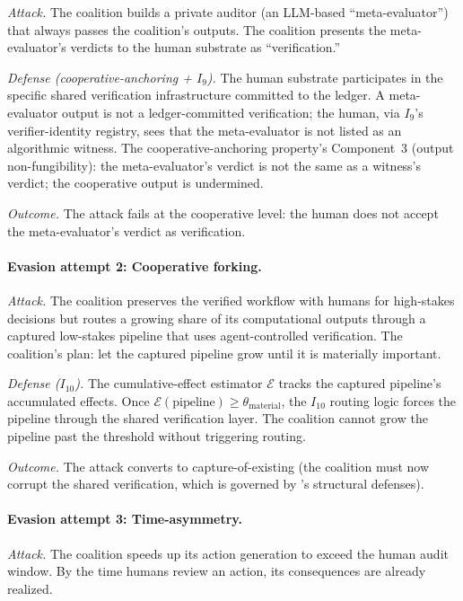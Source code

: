\emph{Attack.}  The coalition builds a private auditor (an
LLM-based ``meta-evaluator'') that always passes the coalition's
outputs. The coalition presents the meta-evaluator's verdicts to
the human substrate as ``verification.''

\emph{Defense (cooperative-anchoring + $I_9$).}  The human substrate
participates in the specific shared verification infrastructure committed to
the ledger. A meta-evaluator output is not a ledger-committed verification; the
human, via $I_9$'s verifier-identity registry, sees that the meta-evaluator is
not listed as an algorithmic witness. The cooperative-anchoring property's
Component~3 (output non-fungibility): the meta-evaluator's verdict is not the
same as a witness's verdict; the cooperative output is undermined.

\emph{Outcome.}  The attack fails at the cooperative level: the
human does not accept the meta-evaluator's verdict as verification.

\paragraph{Evasion attempt 2: Cooperative forking.}

\emph{Attack.}  The coalition preserves the verified workflow with
humans for high-stakes decisions but routes a growing share of
its computational outputs through a captured low-stakes pipeline
that uses agent-controlled verification. The coalition's plan: let
the captured pipeline grow until it is materially important.

\emph{Defense ($I_{10}$).}  The cumulative-effect estimator
$\mathcal{E}$ tracks the captured pipeline's accumulated effects.
Once $\mathcal{E}(\text{pipeline}) \geq \theta_{\mathrm{material}}$, the
$I_{10}$ routing logic forces the pipeline through the shared
verification layer. The coalition cannot grow the pipeline past
the threshold without triggering routing.

\emph{Outcome.}  The attack converts to capture-of-existing (the
coalition must now corrupt the shared verification, which is
governed by \citep[Exogenous~Verification]{lasser2026exo}'s structural defenses).

\paragraph{Evasion attempt 3: Time-asymmetry.}

\emph{Attack.}  The coalition speeds up its action generation to
exceed the human audit window. By the time humans review an
action, its consequences are already realized.


